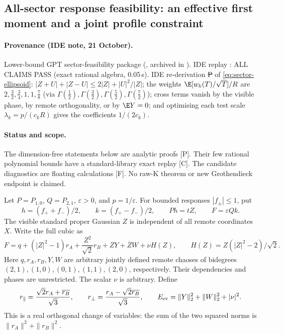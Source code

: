 \subsection{All-sector response feasibility: an effective first moment and a joint profile constraint}
\label{sec:sector-rice-feasibility}
\paragraph{Provenance (IDE note, 21 October).} Lower-bound GPT sector-feasibility package (, archived in
). IDE replay : ALL CLAIMS PASS (exact rational algebra, 0.05\,s). IDE re-derivation \st{P}
of \eqref{eq:sector-ellipsoid}: $|Z+U|+|Z-U|\le2|Z|+|U|^2/|Z|$; the weights $\E[w_k(T)/\sqrt T]/R$ are $2,\frac32,\frac34,1,1,\frac78$ (via $\Gamma(\frac12),\Gamma(\frac32),\Gamma(\frac52),
\Gamma(\frac72)$); cross terms vanish by the visible phase, by remote orthogonality, or by $\E Y=0$; and optimising each test scale $\lambda_k=p/(c_kR)$ gives the
coefficients $1/(2c_k)$.

\paragraph{Status and scope.}
The dimension-free statements below are analytic proofs [P]. Their few
rational polynomial bounds have a standard-library exact replay [C].
The candidate diagnostics are floating calculations [F]. No raw-K theorem
or new Grothendieck endpoint is claimed.

Let $P=P_{1,0}$, $Q=P_{2,1}$, $\varepsilon>0$, and $p=1/\varepsilon$.
For bounded responses $|f_\pm|\le1$, put
\[
 h=(f_++f_-)/2,\qquad k=(f_+-f_-)/2,\qquad Ph=tZ,
 \qquad F=\varepsilon Qk.
\]
The visible standard proper Gaussian $Z$ is independent of all remote
coordinates $X$. Write the full cubic as
\[
 F=q+(|Z|^2-1)r_A+\frac{Z^2}{\sqrt2}r_B
       +ZY+\overline ZW+\nu H(Z),\qquad
 H(Z)=Z(|Z|^2-2)/\sqrt2.
\]
Here $q,r_A,r_B,Y,W$ are arbitrary jointly defined remote chaoses of
bidegrees $(2,1),(1,0),(0,1),(1,1),(2,0)$, respectively.
Their dependencies and phases are unrestricted. The scalar $\nu$ is
arbitrary. Define
\[
 r_\parallel=\frac{\sqrt2r_A+\overline{r_B}}{\sqrt3},\qquad
 r_\perp=\frac{r_A-\sqrt2\overline{r_B}}{\sqrt3},\qquad
 E_{\rm ev}=\|Y\|_2^2+\|W\|_2^2+|\nu|^2.
\]
This is a real orthogonal change of variables: the sum of the two squared
norms is $\|r_A\|^2+\|r_B\|^2$.

